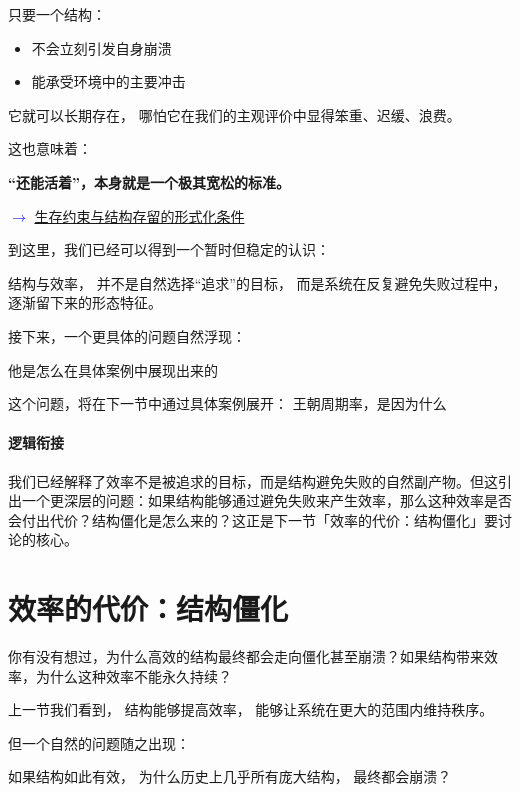 \documentclass[openany, a4paper, 12pt]{book}
\newcommand{\mathlink}[2]{%
	\par\noindent
	\textcolor{blue}{\small$\rightarrow$ \hyperref[#1]{#2}}
	\par
}
\newcommand{\lowfreq}[1]{\textbf{\textcolor{red!70!black}{#1}}}
\begin{document}
只要一个结构：
\begin{itemize}
	\item 不会立刻引发自身崩溃
	\item 能承受环境中的主要冲击
\end{itemize}

它就可以长期存在，
哪怕它在我们的主观评价中显得笨重、迟缓、浪费。

这也意味着：

\lowfreq{“还能活着”，本身就是一个极其宽松的标准。}

\mathlink{math:survival_constraint}{生存约束与结构存留的形式化条件}

\begin{readingnote}
	到这里，我们已经可以得到一个暂时但稳定的认识：
	
	结构与效率，
	并不是自然选择“追求”的目标，
	而是系统在反复避免失败过程中，
	逐渐留下来的形态特征。
	
	接下来，一个更具体的问题自然浮现：
	
	他是怎么在具体案例中展现出来的
\end{readingnote}

这个问题，将在下一节中通过具体案例展开：
王朝周期率，是因为什么

\paragraph*{逻辑衔接}
我们已经解释了效率不是被追求的目标，而是结构避免失败的自然副产物。但这引出一个更深层的问题：如果结构能够通过避免失败来产生效率，那么这种效率是否会付出代价？结构僵化是怎么来的？这正是下一节「效率的代价：结构僵化」要讨论的核心。

\section{效率的代价：结构僵化} \label{sec:rigidity}

\begin{readingnote}
	你有没有想过，为什么高效的结构最终都会走向僵化甚至崩溃？如果结构带来效率，为什么这种效率不能永久持续？
\end{readingnote}

上一节我们看到，
结构能够提高效率，
能够让系统在更大的范围内维持秩序。

但一个自然的问题随之出现：

\begin{questionbox}
	如果结构如此有效，
	为什么历史上几乎所有庞大结构，
	最终都会崩溃？
\end{questionbox}
\end{document}
